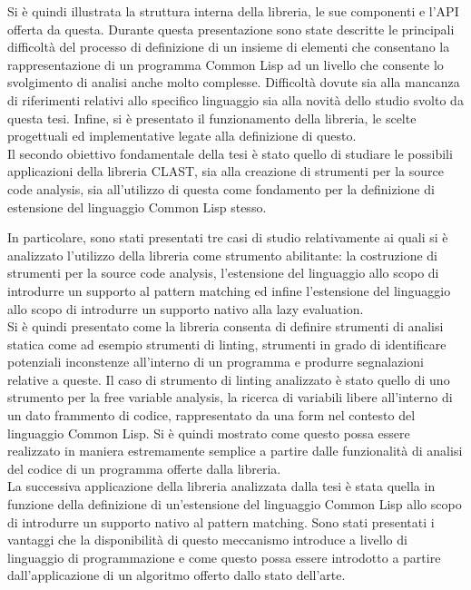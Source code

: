 \documentclass{book}
\begin{document}
Si è quindi illustrata la struttura interna della libreria, le sue componenti e
l'API offerta da questa. Durante questa presentazione sono state descritte le
principali difficoltà del processo di definizione di un insieme di elementi che
consentano la rappresentazione di un programma Common Lisp ad un livello che
consente lo svolgimento di analisi anche molto complesse. Difficoltà dovute sia
alla mancanza di riferimenti relativi allo specifico linguaggio sia alla novità
dello studio svolto da questa tesi. Infine, si è presentato il funzionamento
della libreria, le scelte progettuali ed implementative legate alla definizione
di questo.\\

Il secondo obiettivo fondamentale della tesi è stato quello di studiare le
possibili applicazioni della libreria CLAST, sia alla creazione di strumenti per
la source code analysis, sia all'utilizzo di questa come fondamento per la
definizione di estensione del linguaggio Common Lisp stesso.

In particolare, sono stati presentati tre casi di studio relativamente ai quali
si è analizzato l'utilizzo della libreria come strumento abilitante: la
costruzione di strumenti per la source code analysis, l'estensione del
linguaggio allo scopo di introdurre un supporto al pattern matching ed infine
l'estensione del linguaggio allo scopo di introdurre un supporto nativo alla
lazy evaluation.\\

Si è quindi presentato come la libreria consenta di definire strumenti di
analisi statica come ad esempio strumenti di linting, strumenti in grado di
identificare potenziali inconstenze all'interno di un programma e produrre
segnalazioni relative a queste. Il caso di strumento di linting analizzato è
stato quello di uno strumento per la free variable analysis, la ricerca di
variabili libere all'interno di un dato frammento di codice, rappresentato da
una form nel contesto del linguaggio Common Lisp. Si è quindi mostrato come
questo possa essere realizzato in maniera estremamente semplice a partire dalle
funzionalità di analisi del codice di un programma offerte dalla libreria.\\

La successiva applicazione della libreria analizzata dalla tesi è stata quella
in funzione della definizione di un'estensione del linguaggio Common Lisp allo
scopo di introdurre un supporto nativo al pattern matching. Sono stati
presentati i vantaggi che la disponibilità di questo meccanismo introduce a
livello di linguaggio di programmazione e come questo possa essere introdotto a
partire dall'applicazione di un algoritmo offerto dallo stato dell'arte.
\end{document}
